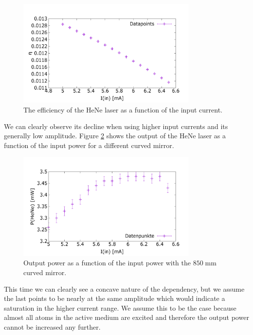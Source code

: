 \documentclass[../main.tex]{subfiles}
\begin{document}
    \begin{figure}[H]
        \centering
        \includegraphics[width=0.8\textwidth]{Bilddateien/2/efficiency-over-in-current.png}
        \caption{The efficiency of the HeNe laser as a function of the input current.}
        \label{fig:efficiency_over_input_current}
    \end{figure}
    We can clearly observe its decline when using higher input currents and its generally low amplitude. Figure \ref{fig:output_power_over_input_power_curved} shows the output of the HeNe laser as a function of the input power for a different curved mirror.

    
    \begin{figure}[H]
        \centering
        \includegraphics[width=0.8\textwidth]{Bilddateien/6/P(HeNe)overI(in).png}
        \caption{Output power as a function of the input power with the $850\;\si{\mm}$ curved mirror.}
        \label{fig:output_power_over_input_power_curved}
    \end{figure}

    This time we can clearly see a concave nature of the dependency, but we assume the last points to be nearly at the same amplitude which would indicate a saturation in the higher current range. We assume this to be the case because almost all atoms in the active medium are excited and therefore the output power cannot be increased any further. 
\end{document}
